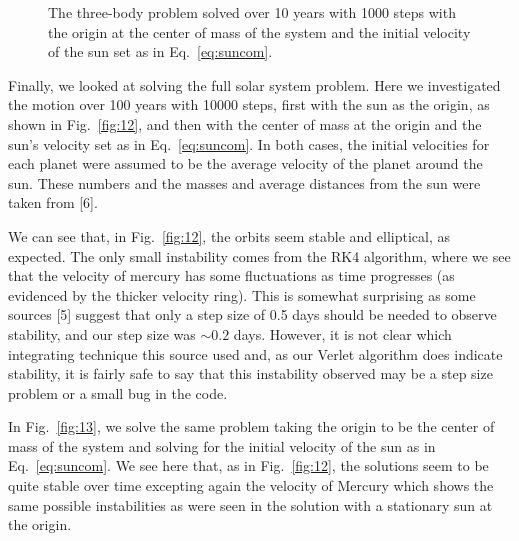 \documentclass[12pt]{article}
\numberwithin{equation}{section}
\begin{document}
\begin{figure}[h]
\begin{center}
\begin{subfigure}
\end{subfigure} 
\caption{The three-body problem solved over 10 years with 1000 steps with the origin at the center of mass of the system and the initial velocity of the sun set as in Eq.~\ref{eq:suncom}.}
\label{fig:11}
\end{center}
\end{figure}

\par Finally, we looked at solving the full solar system problem.  Here we investigated the motion over 100 years with 10000 steps, first with the sun as the origin, as shown in Fig.~\ref{fig:12}, and then with the center of mass at the origin and the sun's velocity set as in Eq.~\ref{eq:suncom}.  In both cases, the initial velocities for each planet were assumed to be the average velocity of the planet around the sun.  These numbers and the masses and average distances from the sun were taken from [6].
\par We can see that, in Fig.~\ref{fig:12}, the orbits seem stable and elliptical, as expected.  The only small instability comes from the RK4 algorithm, where we see that the velocity of mercury has some fluctuations as time progresses (as evidenced by the thicker velocity ring).  This is somewhat surprising as some sources [5] suggest that only a step size of 0.5 days should be needed to observe stability, and our step size was $\sim0.2$ days.  However, it is not clear which integrating technique this source used and, as our Verlet algorithm does indicate stability, it is fairly safe to say that this instability observed may be a step size problem or a small bug in the code.  
\par In Fig.~\ref{fig:13}, we solve the same problem taking the origin to be the center of mass of the system and solving for the initial velocity of the sun as in Eq.~\ref{eq:suncom}.  We see here that, as in Fig.~\ref{fig:12}, the solutions seem to be quite stable over time excepting again the velocity of Mercury which shows the same possible instabilities as were seen in the solution with a stationary sun at the origin.
\end{document}
